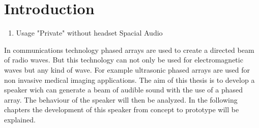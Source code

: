 \chapter{Introduction}

\begin{enumerate}
  \item Usage
  \subitem "Private" without headset
  \subitem Spacial Audio
\end{enumerate}

In communications technology phased arrays are used to create a directed beam of radio waves. But this technology can not only be used for electromagnetic waves but any kind of wave. For example ultrasonic phased arrays are used for non invasive medical imaging applications.\p
The aim of this thesis is to develop a speaker wich can generate a beam of audible sound with the use of a phased array. The behaviour of the speaker will then be analyzed.\p
In the following chapters the development of this speaker from concept to prototype will be explained.
